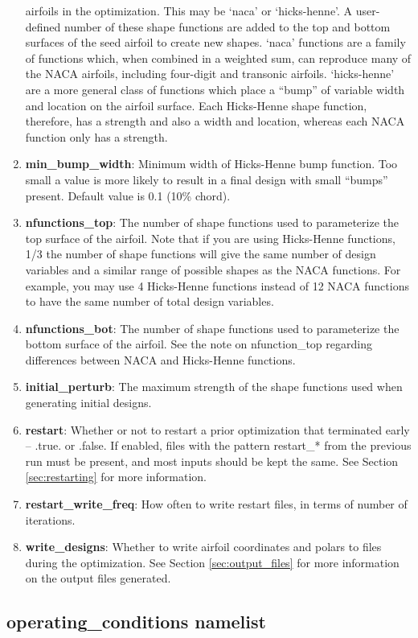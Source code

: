 \documentclass[11pt]{article}
\begin{document}
\begin{enumerate}
{airfoils in the optimization.  This may be `naca' or `hicks-henne'.  A user-defined number
of these shape functions are added to the top and bottom surfaces of the seed airfoil to
create new shapes.  `naca' functions are a family of functions which, when combined in a
weighted sum, can reproduce many of the NACA airfoils, including four-digit and transonic
airfoils.  `hicks-henne' are a more general class of functions which place a ``bump'' of
variable width and location on the airfoil surface.  Each Hicks-Henne shape function,
therefore, has a strength and also a width and location, whereas each NACA function only
has a strength.}
\item{\textbf{min\_bump\_width}: Minimum width of Hicks-Henne bump function.  Too small a
value is more likely to result in a final design with small ``bumps'' present.  Default
value is 0.1 (10\% chord).}
\item{\textbf{nfunctions\_top}: The number of shape functions used to parameterize the top
surface of the airfoil.  Note that if you are using Hicks-Henne functions, 1/3 the
number of shape functions will give the same number of design variables and a similar range of
possible shapes as the NACA functions.  For example, you may use 4 Hicks-Henne functions
instead of 12 NACA functions to have the same number of total design variables.}
\item{\textbf{nfunctions\_bot}: The number of shape functions used to parameterize the
bottom surface of the airfoil.  See the note on nfunction\_top regarding differences
between NACA and Hicks-Henne functions.}
\item{\textbf{initial\_perturb}: The maximum strength of the shape functions used when
generating initial designs.}
\item{\textbf{restart}: Whether or not to restart a prior optimization that terminated
early -- .true. or .false.  If enabled, files with the pattern restart\_* from the 
previous run must be present, and most inputs should be kept the same. See Section 
\ref{sec:restarting} for more information.}
\item{\textbf{restart\_write\_freq}: How often to write restart files, in terms of number
of iterations.}
\item{\textbf{write\_designs}: Whether to write airfoil coordinates and polars to files
during the optimization.  See Section \ref{sec:output_files} for more information on the
output files generated.}
\end{enumerate}

\subsection{operating\_conditions namelist}
\end{document}
